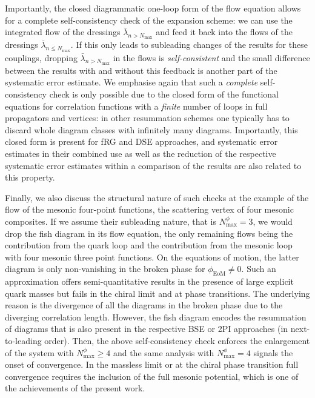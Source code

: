 \documentclass[aps,twocolumn,prd,superscriptaddress]{revtex4-2}
\begin{document}
Importantly, the closed diagrammatic one-loop form of the flow equation allows for a complete self-consistency check of the expansion scheme: we can use the integrated flow of the dressings $\bar\lambda_{n>N_\textrm{max}}$ and feed it back into the flows of the dressings $\bar\lambda_{n\leq N_\textrm{max}}$. If this only leads to subleading changes of the results for these couplings, dropping $\bar\lambda_{n>N_\textrm{max}}$ in the flows is \textit{self-consistent} and the small difference between the results with and without this feedback is another part of the systematic error estimate. We emphasise again that such a \textit{complete} self-consistency check is only possible due to the closed form of the functional equations for correlation functions with a \textit{finite} number of loops in full propagators and vertices: in other resummation schemes one typically has to discard whole diagram classes with infinitely many diagrams. Importantly, this closed form is present for fRG and DSE approaches, and systematic error estimates in their combined use as well as the reduction of the respective systematic error estimates within a comparison of the results are also related to this property. 

Finally, we also discuss the structural nature of such checks at the example of the flow of the mesonic four-point functions, the scattering vertex of four mesonic composites. If we assume their subleading nature, that is $N^\phi_\textrm{max}=3$, we would drop the fish diagram in its flow equation, the only remaining flows being the contribution from the quark loop and the contribution from the mesonic loop with four mesonic three point functions. On the equations of motion, the latter diagram is only non-vanishing in the broken phase for $\phi_\textrm{EoM}\neq 0$. Such an approximation offers semi-quantitative results in the presence of large explicit quark masses but fails in the chiral limit and at phase transitions. The underlying reason is the divergence of all the diagrams in the broken phase due to the diverging correlation length. However, the fish diagram encodes the resummation of diagrams that is also present in the respective BSE or 2PI approaches (in next-to-leading order). Then, the above self-consistency check enforces the enlargement of the system with $N^\phi_\textrm{max}\geq 4$ and 
the same analysis with $N^\phi_\textrm{max}=4$ signals the onset of convergence. In the massless limit or at the chiral phase transition full convergence requires the inclusion of the full mesonic potential, which is one of the achievements of the present work. 
\end{document}
